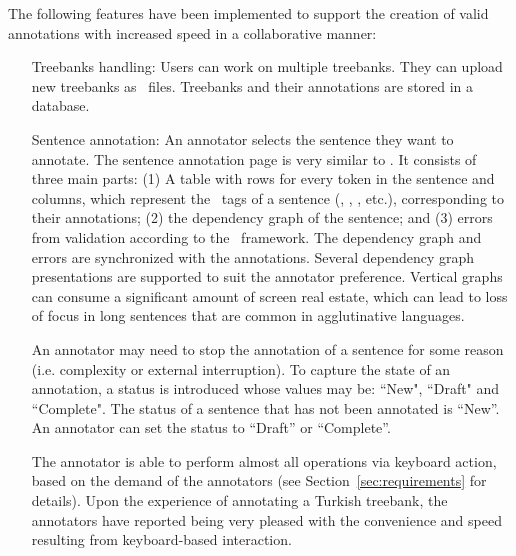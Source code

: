 The following features have been implemented to support the creation of valid annotations with increased speed in a collaborative manner:
\begin{itemize}[before=\normalfont, font=\itshape, align=left,noitemsep,topsep=0pt,parsep=0pt,partopsep=0pt,labelsep=3pt,align=left]
    \item[Treebanks handling:]
        Users can work on multiple treebanks.
        They can upload new treebanks as \conllu\ files.
        Treebanks and their annotations are stored in a database.

    \item[Sentence annotation:]
    	An annotator selects the sentence they want to annotate. 
        The sentence annotation page is very similar to \boatvone.
        It consists of three main parts: (1) A table with rows for every token in the sentence and columns, which represent the \ud\ tags of a sentence (\form, \lemma, \deprel, etc.), corresponding to their annotations; (2) the dependency graph of the sentence; and (3) errors from validation according to the \ud\ framework.
        The dependency graph and errors are synchronized with the annotations.
        Several dependency graph presentations are supported to suit the annotator preference.
        Vertical graphs can consume a significant amount of screen real estate, which can lead to loss of focus in long sentences that are common in agglutinative languages.

        An annotator may need to stop the annotation of a sentence for some reason (i.e. complexity or external interruption).
        To capture the state of an annotation, a status is introduced whose values may be: ``New", ``Draft" and ``Complete". 
        The status of a sentence that has not been annotated is ``New''. 
	An annotator can set the status to ``Draft'' or ``Complete''. 

        The annotator is able to perform almost all operations via keyboard action, based on the demand of the annotators (see Section~\ref{sec:requirements} for details).
        Upon the experience of annotating a Turkish treebank, the annotators have reported being very pleased with the convenience and speed resulting from keyboard-based interaction.


\end{itemize}
